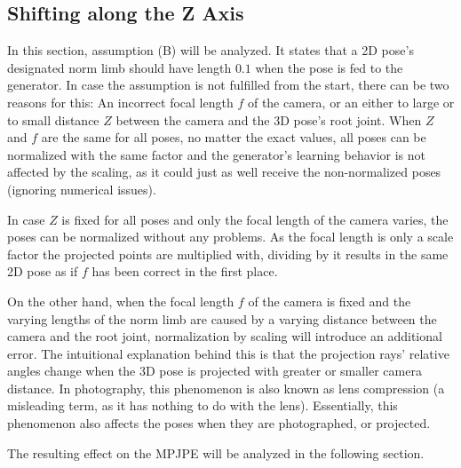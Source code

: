 	
\subsection{Shifting along the Z Axis}
\label{sec:z-shift-error}

In this section, assumption (B) will be analyzed.
It states that a 2D pose's designated norm limb should have length $0.1$ when the pose is fed to the generator.
In case the assumption is not fulfilled from the start, there can be two reasons for this: 
An incorrect focal length $f$ of the camera, or an either to large or to small distance $Z$ between the camera and the 3D pose's root joint.
When $Z$ and $f$ are the same for all poses, no matter the exact values, all poses can be normalized with the same factor and the generator's learning behavior is not affected by the scaling, as it could just as well receive the non-normalized poses (ignoring numerical issues).

In case $Z$ is fixed for all poses and only the focal length of the camera varies, the poses can be normalized without any problems.
As the focal length is only a scale factor the projected points are multiplied with, dividing by it results in the same 2D pose as if $f$ has been correct in the first place.

On the other hand, when the focal length $f$ of the camera is fixed and the varying lengths of the norm limb are caused by a varying distance between the camera and the root joint, normalization by scaling will introduce an additional error.
The intuitional explanation behind this is that the projection rays' relative angles change when the 3D pose is projected with greater or smaller camera distance.
In photography, this phenomenon is also known as lens compression (a misleading term, as it has nothing to do with the lens).
Essentially, this phenomenon also affects the poses when they are photographed, or projected.

The resulting effect on the MPJPE will be analyzed in the following section.

